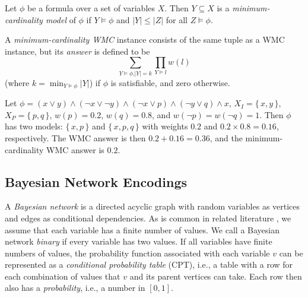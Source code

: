 \begin{definition}
  Let $\phi$ be a formula over a set of variables $X$. Then $Y \subseteq X$ is a
  \emph{minimum-cardinality model} of $\phi$ if $Y \models \phi$ and $|Y| \le
  |Z|$ for all $Z \models \phi$.
\end{definition}

\begin{definition}\label{def:mcwmc}
  A \emph{minimum-cardinality WMC} instance consists of the same tuple as a WMC
  instance, but its \emph{answer} is defined to be
  \[
  \sum_{Y \models \phi\text{,}|Y| = k} \prod_{Y \models l} w(l)
  \]
  (where $k = \min_{Y \models \phi} |Y|$) if $\phi$ is satisfiable, and zero otherwise.
\end{definition}

\begin{example}\label{example:1}
  Let
  $\phi = (x \lor y) \land (\neg x \lor \neg y) \land (\neg x \lor p) \land (\neg y \lor q) \land x$,
  $X_I = \{\, x, y \,\}$, $X_P = \{\, p, q \,\}$, $w(p) = 0.2$, $w(q) = 0.8$,
  and $w(\neg p) = w(\neg q) = 1$. Then $\phi$ has two models: $\{\, x, p \,\}$
  and $\{\, x, p, q \,\}$ with weights $0.2$ and $0.2 \times 0.8 = 0.16$,
  respectively. The WMC answer is then $0.2 + 0.16 = 0.36$, and the
  minimum-cardinality WMC answer is $0.2$.
\end{example}

\subsection{Bayesian Network Encodings}\label{sec:encodings}

A \emph{Bayesian network} is a directed acyclic graph with random variables as
vertices and edges as conditional dependencies. As is common in related
literature \citep{DBLP:conf/kr/Darwiche02,DBLP:conf/aaai/SangBK05}, we assume
that each variable has a finite number of values. We call a Bayesian network
\emph{binary} if every variable has two values. If all variables have finite
numbers of values, the probability function associated with each variable $v$
can be represented as a \emph{conditional probability table} (CPT), i.e., a
table with a row for each combination of values that $v$ and its parent vertices
can take. Each row then also has a \emph{probability}, i.e., a number in
$[0, 1]$.

